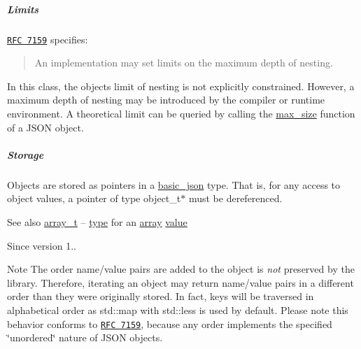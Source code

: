 \subparagraph*{Limits}

\href{http://rfc7159.net/rfc7159}{\tt R\+FC 7159} specifies\+: \begin{quote}
An implementation may set limits on the maximum depth of nesting. \end{quote}


In this class, the object\textquotesingle{}s limit of nesting is not explicitly constrained. However, a maximum depth of nesting may be introduced by the compiler or runtime environment. A theoretical limit can be queried by calling the \mbox{\hyperlink{classnlohmann_1_1basic__json_a2f47d3c6a441c57dd2be00449fbb88e1}{max\+\_\+size}} function of a J\+S\+ON object.

\subparagraph*{Storage}

Objects are stored as pointers in a \mbox{\hyperlink{classnlohmann_1_1basic__json}{basic\+\_\+json}} type. That is, for any access to object values, a pointer of type {\ttfamily object\+\_\+t$\ast$} must be dereferenced.

\begin{DoxySeeAlso}{See also}
\mbox{\hyperlink{classnlohmann_1_1basic__json_ae095578e03df97c5b3991787f1056374}{array\+\_\+t}} -- \mbox{\hyperlink{classnlohmann_1_1basic__json_a2b2d781d7f2a4ee41bc0016e931cadf7}{type}} for an \mbox{\hyperlink{classnlohmann_1_1basic__json_aa80485befaffcadaa39965494e0b4d2e}{array}} \mbox{\hyperlink{classnlohmann_1_1basic__json_adcf8ca5079f5db993820bf50036bf45d}{value}}
\end{DoxySeeAlso}
\begin{DoxySince}{Since}
version 1..
\end{DoxySince}
\begin{DoxyNote}{Note}
The order name/value pairs are added to the object is {\itshape not} preserved by the library. Therefore, iterating an object may return name/value pairs in a different order than they were originally stored. In fact, keys will be traversed in alphabetical order as {\ttfamily std\+::map} with {\ttfamily std\+::less} is used by default. Please note this behavior conforms to \href{http://rfc7159.net/rfc7159}{\tt R\+FC 7159}, because any order implements the specified \char`\"{}unordered\char`\"{} nature of J\+S\+ON objects. 
\end{DoxyNote}
\mbox{\label{classnlohmann_1_1basic__json_a3333a5a8714912adda33a35b369f7b3d}} 
